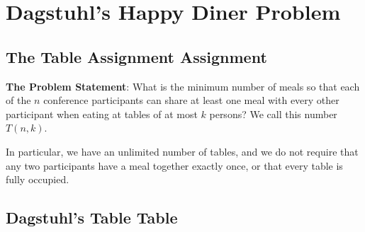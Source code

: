 \documentclass[a4paper]{article}
\begin{document}
\clearpage

\section{Dagstuhl's Happy Diner
Problem}\label{dagstuhls-happy-diner-problem}

\subsection{The Table Assignment
Assignment}\label{the-table-assignment-assignment}

\textbf{The Problem Statement}: What is the minimum number of meals so
that each of the $n$ conference participants can share at least
one meal with every other participant when eating at tables of at most
$k$ persons? We call this number $T(n,k)$.

In particular, we have an unlimited number of tables, and we do not
require that any two participants have a meal together exactly once, or
that every table is fully occupied.

\subsection{Dagstuhl's Table Table}\label{dagstuhls-table-table}
\end{document}
